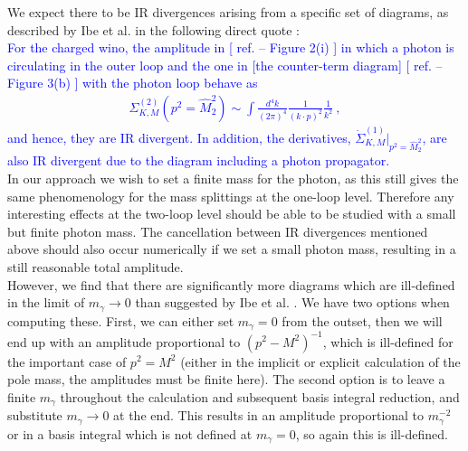 \documentclass[11pt]{article}
\begin{document}
We expect there to be IR divergences arising from a specific set of diagrams, as described by Ibe et al. in the following direct quote \cite{Ibe2013a}:\\

\textcolor{blue}{
For the charged wino, the amplitude in [ ref. \cite{Ibe2013a} -- Figure 2(i) ] in which a photon is circulating
in the outer loop and the one in [the counter-term diagram] [ ref. \cite{Ibe2013a} -- Figure 3(b) ] with the photon loop behave as
\begin{eqnarray}
\Sigma_{K,M}^{(2)}(p^2=\hat{M}_2^2) \sim
\int \frac{d^4 k}{(2\pi)^4} \frac{1}{(k\cdot p)^2} \frac{1}{k^2} \ ,
\end{eqnarray}
and hence, they are IR divergent.
In addition, the derivatives, $\dot{\Sigma}_{K,M}^{(1)} |_{p^2=\hat{M}_2^2}$, 
are also IR divergent due to the diagram including a photon propagator. 
}\\

In our approach we wish to set a finite mass for the photon, as this still gives the same phenomenology for the mass splittings at the one-loop level.  Therefore any interesting effects at the two-loop level should be able to be studied with a small but finite photon mass.  The cancellation between IR divergences mentioned above should also occur numerically if we set a small photon mass, resulting in a still reasonable total amplitude.\\

However, we find that there are significantly more diagrams which are ill-defined in the limit of $m_{\gamma}\rightarrow 0$ than suggested by Ibe et al. \cite{Ibe2013a}.  We have two options when computing these.  First, we can either set $m_{\gamma}=0$ from the outset, then we will end up with an amplitude proportional to $(p^2-M^2)^{-1}$, which is ill-defined for the important case of $p^2=M^2$ (either in the implicit or explicit calculation of the pole mass, the amplitudes must be finite here).  The second option is to leave a finite $m_{\gamma}$ throughout the calculation and subsequent basis integral reduction, and substitute $m_{\gamma}\rightarrow 0$ at the end.  This results in an amplitude proportional to $m_{\gamma}^{-2}$ or in a basis integral which is not defined at $m_{\gamma}=0$, so again this is ill-defined.\\
\end{document}
